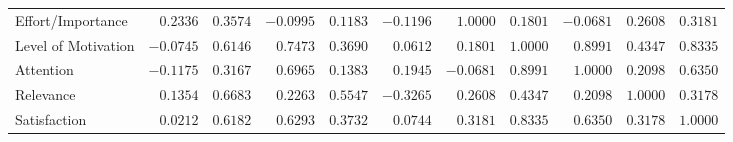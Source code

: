 \documentclass[6pt]{article}
\begin{document}
\begin{landscape}
{\begin{longtable}{lrrrrrrrrrr}
Effort/Importance&$ 0.2336$&$ 0.3574$&$-0.0995$&$ 0.1183$&$-0.1196$&$ 1.0000$&$ 0.1801$&$-0.0681$&$ 0.2608$&$0.3181$\tabularnewline
Level of Motivation&$-0.0745$&$ 0.6146$&$ 0.7473$&$ 0.3690$&$ 0.0612$&$ 0.1801$&$ 1.0000$&$ 0.8991$&$ 0.4347$&$0.8335$\tabularnewline
Attention&$-0.1175$&$ 0.3167$&$ 0.6965$&$ 0.1383$&$ 0.1945$&$-0.0681$&$ 0.8991$&$ 1.0000$&$ 0.2098$&$0.6350$\tabularnewline
Relevance&$ 0.1354$&$ 0.6683$&$ 0.2263$&$ 0.5547$&$-0.3265$&$ 0.2608$&$ 0.4347$&$ 0.2098$&$ 1.0000$&$0.3178$\tabularnewline
Satisfaction&$ 0.0212$&$ 0.6182$&$ 0.6293$&$ 0.3732$&$ 0.0744$&$ 0.3181$&$ 0.8335$&$ 0.6350$&$ 0.3178$&$1.0000$\tabularnewline
\hline
\end{longtable}}\end{landscape}

\end{document}

